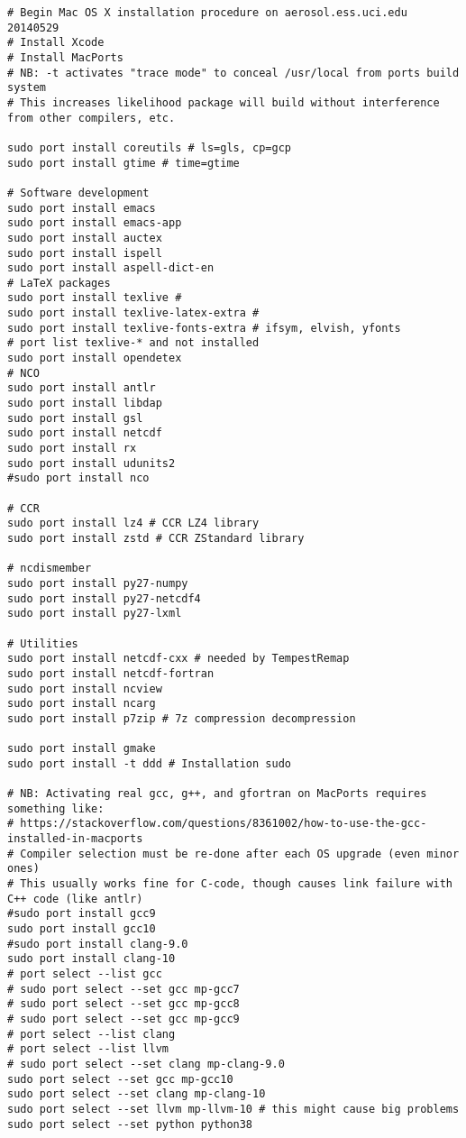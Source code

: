\documentclass[12pt,twoside]{article}
\begin{document}
\begin{verbatim}
# Begin Mac OS X installation procedure on aerosol.ess.uci.edu 20140529
# Install Xcode
# Install MacPorts
# NB: -t activates "trace mode" to conceal /usr/local from ports build system
# This increases likelihood package will build without interference from other compilers, etc.

sudo port install coreutils # ls=gls, cp=gcp
sudo port install gtime # time=gtime

# Software development
sudo port install emacs
sudo port install emacs-app
sudo port install auctex
sudo port install ispell
sudo port install aspell-dict-en
# LaTeX packages
sudo port install texlive # 
sudo port install texlive-latex-extra # 
sudo port install texlive-fonts-extra # ifsym, elvish, yfonts
# port list texlive-* and not installed
sudo port install opendetex
# NCO
sudo port install antlr
sudo port install libdap
sudo port install gsl
sudo port install netcdf
sudo port install rx
sudo port install udunits2
#sudo port install nco

# CCR
sudo port install lz4 # CCR LZ4 library
sudo port install zstd # CCR ZStandard library

# ncdismember
sudo port install py27-numpy
sudo port install py27-netcdf4
sudo port install py27-lxml

# Utilities
sudo port install netcdf-cxx # needed by TempestRemap
sudo port install netcdf-fortran
sudo port install ncview
sudo port install ncarg
sudo port install p7zip # 7z compression decompression

sudo port install gmake
sudo port install -t ddd # Installation sudo

# NB: Activating real gcc, g++, and gfortran on MacPorts requires something like:
# https://stackoverflow.com/questions/8361002/how-to-use-the-gcc-installed-in-macports
# Compiler selection must be re-done after each OS upgrade (even minor ones)
# This usually works fine for C-code, though causes link failure with C++ code (like antlr)
#sudo port install gcc9
sudo port install gcc10
#sudo port install clang-9.0
sudo port install clang-10
# port select --list gcc
# sudo port select --set gcc mp-gcc7
# sudo port select --set gcc mp-gcc8
# sudo port select --set gcc mp-gcc9
# port select --list clang
# port select --list llvm
# sudo port select --set clang mp-clang-9.0
sudo port select --set gcc mp-gcc10
sudo port select --set clang mp-clang-10
sudo port select --set llvm mp-llvm-10 # this might cause big problems
sudo port select --set python python38


\end{verbatim}
\end{document}
